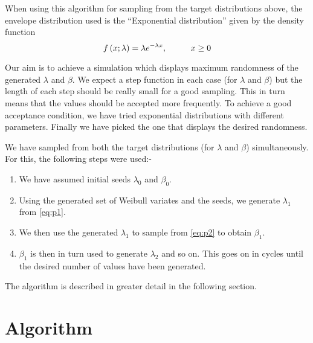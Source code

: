 \documentclass[11pt]{article}
\numberwithin{equation}{section}
\begin{document}
When using this algorithm for sampling from the target distributions above, the envelope distribution used is the ``Exponential distribution'' given by the density function
\begin{equation} \label{eq:exp_pdf}
f\left(x; \lambda\right) = \lambda e^{-\lambda x}, \hspace{1.0cm} x \geq 0
\end{equation}

Our aim is to achieve a simulation which displays maximum randomness of the generated $\lambda$ and $\beta$. We expect a step function in each case (for $\lambda$ and $\beta$) but the length of each step should be really small for a good sampling. This in turn means that the values should be accepted more frequently. To achieve a good acceptance condition, we have tried exponential distributions with different parameters. Finally we have picked the one that displays the desired randomness. \medskip

We have sampled from both the target distributions (for $\lambda$ and $\beta$) simultaneously. For this, the following steps were used:-

\begin{enumerate}
	\item We have assumed initial seeds $\lambda_0$ and $\beta_0$.
	
	\item Using the generated set of Weibull variates and the seeds, we generate $\lambda_1$ from \eqref{eq:p1}.

	\item We then use the generated $\lambda_1$ to sample from \eqref{eq:p2} to obtain $\beta_1$.

	\item $\beta_1$ is then in turn used to generate $\lambda_2$ and so on. This goes on in cycles until the desired number of values have been generated.
\end{enumerate}
\medskip

The algorithm is described in greater detail in the following section.

\pagebreak

\section{Algorithm}
\medskip
\end{document}

